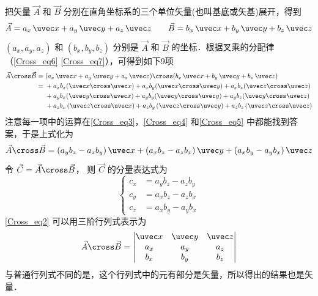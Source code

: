 把矢量 $\vec A$ 和 $\vec B$ 分别在直角坐标系的三个单位矢量(也叫基底或矢基)展开，得到
\begin{equation}
\vec A = a_x\,\uvec x + a_y\,\uvec y + a_z\,\uvec z \qquad \vec B = b_x\,\uvec x + b_y\,\uvec y + b_z\,\uvec z
\end{equation}
$(a_x,a_y,a_z)$ 和 $(b_x,b_y,b_z)$ 分别是 $\vec A$ 和 $\vec B$ 的坐标．根据叉乘的分配律（\autoref{Cross_eq6} \autoref{Cross_eq7}），可得到如下9项
\begin{equation}
\begin{aligned}
\vec A \cross \vec B ={} &(a_x\,\uvec x + a_y\,\uvec y + a_z\,\uvec z) \cross (b_x\,\uvec x + b_y\,\uvec y + b_z\,\uvec z)\\
={} &+ {a_x}{b_x}(\uvec x \cross \uvec x) + {a_x}{b_y}(\uvec x \cross \uvec y) + {a_x}{b_z}(\uvec z \cross \uvec z)\\
&+ {a_y}{b_x}(\uvec y \cross \uvec x) + {a_y}{b_y}(\uvec y \cross \uvec y) + {a_y}{b_z}(\uvec y \cross \uvec z)\\
&+ {a_z}{b_x}\left( {\uvec z \cross \uvec x} \right) + {a_z}{b_y}\left( {\uvec z \cross \uvec y} \right) + {a_z}{b_z}\left( {\uvec z \cross \uvec z} \right)
\end{aligned}
\end{equation}
注意每一项中的运算在\autoref{Cross_eq3}，\autoref{Cross_eq4} 和\autoref{Cross_eq5} 中都能找到答案，于是上式化为
\begin{equation}\label{Cross_eq2}
\vec A \cross \vec B = (a_y b_z - a_z b_y)\,\uvec x + (a_x b_z - a_z b_x)\,\uvec y + (a_x b_y - a_y b_x)\,\uvec z
\end{equation}
令 $\vec C = \vec A \cross \vec B$， 则 $\vec C$ 的分量表达式为
\begin{equation}
\left\{ \begin{aligned}
{c_x} &= {a_y}{b_z} - {a_z}{b_y}\\
{c_y} &= {a_x}{b_z} - {a_z}{b_x}\\
{c_z} &= {a_x}{b_y} - {a_y}{b_x}
\end{aligned} \right.
\end{equation}
\autoref{Cross_eq2} 可以用三阶行列式表示为
\begin{equation}
\vec A \cross \vec B = 
\begin{vmatrix}
{\uvec x} & {\uvec y} &{ \uvec z}\\
{a_x} & {a_y} & {a_z}\\
{b_x} & {b_y} & {b_z}
\end{vmatrix} \end{equation}
与普通行列式不同的是，这个行列式中的元有部分是矢量，所以得出的结果也是矢量．

